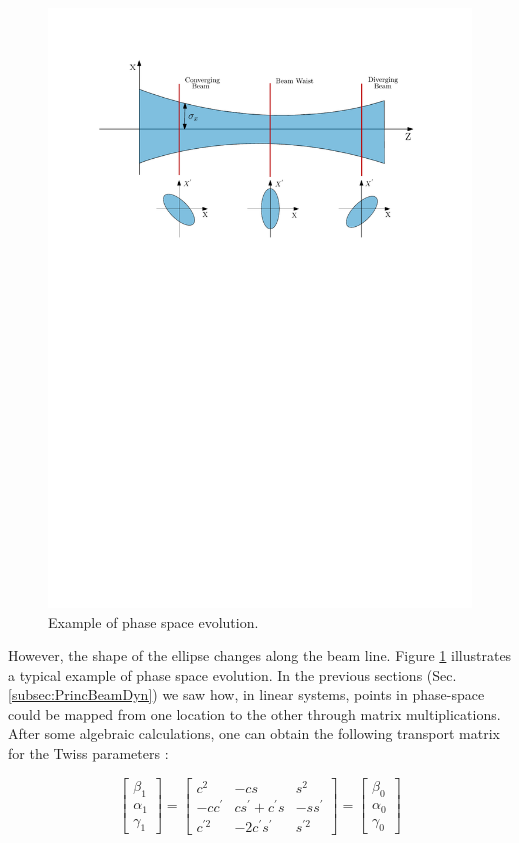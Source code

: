 \begin{figure}[h]
    \centering
    \includegraphics[width=0.85\columnwidth]{Figure_BeamEvolution/BeamEvolution.pdf}
    \caption{Example of phase space evolution. }
    \label{fig:PhasSpaceEvol}
\end{figure}

However, the shape of the ellipse changes along the beam line. Figure \ref{fig:PhasSpaceEvol} illustrates a typical example of phase space evolution. 
In the previous sections (Sec. \ref{subsec:PrincBeamDyn}) we saw how, in linear systems, points in phase-space could be mapped from one location to the other through matrix multiplications. After some algebraic calculations, one can obtain the following transport matrix for the Twiss parameters \parencite*[][]{ref:MatrixToTwiss}:

\begin{equation}
    \begin{bmatrix}
       \beta_1 \\ \alpha_1 \\ \gamma_1
    \end{bmatrix}
    =
\begin{bmatrix}
   c^2 & - c s & s^2 \\ -c c^{'} & cs^{'} + c^{'}s & -s s^{'} \\ c^{'2} & -2c^{'}s^{'} & s^{'2}
\end{bmatrix}
=
\begin{bmatrix}
   \beta_0 \\ \alpha_0 \\ \gamma_0
\end{bmatrix}
\label{eq:MatrixEq}
\end{equation}

